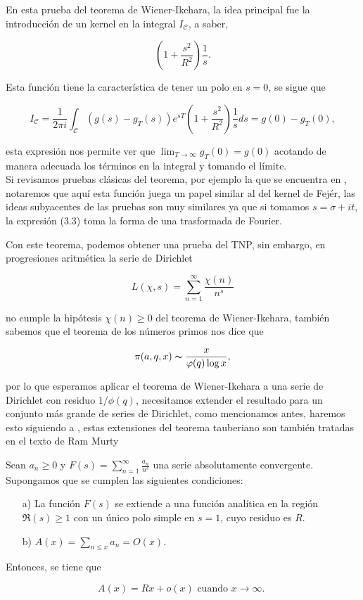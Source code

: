 \begin{note}
    En esta prueba del teorema de Wiener-Ikehara, la idea principal fue la introducción de un kernel en la integral $I_{\mathscr{C}}$, a saber,

    $$\displaystyle \left(1+\frac{s^2}{R^2}\right)\frac{1}{s}.$$

    Esta función tiene la característica de tener un polo en $s=0$, se sigue que

    $$I_{\mathscr{C}}=\frac{1}{2\pi i}\int_{\mathscr{C}}\left(g(s)-g_T(s)\right)e^{sT}\left(1+\frac{s^2}{R^2}\right)\frac{1}{s}ds=g(0)-g_T(0),$$

    esta expresión nos permite ver que $\lim_{T \to \infty} g_T(0)=g(0)$ acotando de manera adecuada los términos en la integral y tomando el límite.\\

    Si revisamos pruebas clásicas del teorema, por ejemplo la que se encuentra en \cite{murty2007problems}, notaremos que aquí esta función juega un papel similar al del kernel de Fejér, las ideas subyacentes de las pruebas son muy similares ya que si tomamos $s=\sigma+it$, la expresión (3.3) toma la forma de una trasformada de Fourier.\\

\end{note}

Con este teorema, podemos obtener una prueba del TNP, sin embargo, en progresiones aritmética la serie de Dirichlet 

$$L(\chi,s)=\sum_{n=1}^{\infty} \frac{\chi(n)}{n^s}$$

no cumple la hipótesis $\chi(n)\geq 0$ del teorema de Wiener-Ikehara, también sabemos que el teorema de los números primos nos dice que

$$\pi(a,q,x)\thicksim \frac{x}{\varphi(q)\log  x},$$

por lo que esperamos aplicar el teorema de Wiener-Ikehara a una serie de Dirichlet con residuo $1/\phi(q)$, necesitamos extender el resultado para un conjunto más grande de series de Dirichlet, como mencionamos antes, haremos esto siguiendo a \cite{vatwani2015simple}, estas extensiones del teorema tauberiano son también tratadas en el texto de Ram Murty \cite{murty2007problems}

\begin{corollary}
    Sean $a_n \geq 0$ y $F(s)=\displaystyle\sum_{n=1}^{\infty} \frac{a_n}{n^s}$ una serie absolutamente convergente. Supongamos que se cumplen las siguientes condiciones:

\begin{itemize}
\item[a)] La función $F(s)$ se extiende a una función analítica en la región $\Re(s) \geq 1$ con un único polo simple en $s=1$, cuyo residuo es $R$.
\item[b)] $A(x)=\displaystyle \sum_{n \leq x} a_n=O(x)$.
\end{itemize}


Entonces, se tiene que

$$
A(x)=Rx+o(x) \text { cuando } x \rightarrow \infty \text {. }
$$
\end{corollary}

